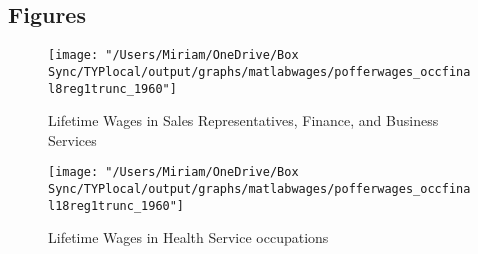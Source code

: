 \documentclass[12pt]{article}
\begin{document}
%


\newpage

\clearpage


\subsection{Figures}



\begin{figure}[H]
\centering
\caption{Lifetime Wages in Sales Representatives, Finance, and Business Services}
\label{sales}
\texttt{[image: "/Users/Miriam/OneDrive/Box Sync/TYPlocal/output/graphs/matlabwages/pofferwages\_occfinal8reg1trunc\_1960"]}
\end{figure}

\begin{figure}[H]
\centering
\caption{Lifetime Wages in Health Service occupations}
\label{health}
\texttt{[image: "/Users/Miriam/OneDrive/Box Sync/TYPlocal/output/graphs/matlabwages/pofferwages\_occfinal18reg1trunc\_1960"]}
\end{figure}
\end{document}
